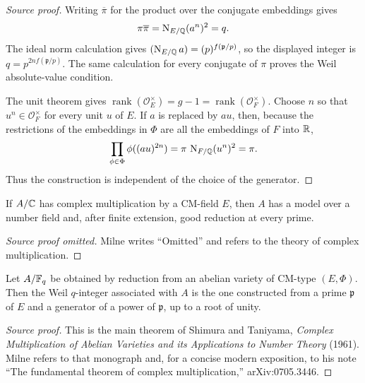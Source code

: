 \begin{proof}[Source proof]
Writing $\overline{\pi}$ for the product over the conjugate embeddings gives
\[
 \pi\overline{\pi}=\operatorname{N}_{E/\mathbb{Q}}(a^n)^2=q.
\]
The ideal norm calculation gives
$(\operatorname{N}_{E/\mathbb{Q}}a)=(p)^{f(\mathfrak p/p)}$, so the displayed integer is
$q=p^{2nf(\mathfrak p/p)}$. The same calculation for every conjugate of
$\pi$ proves the Weil absolute-value condition.

The unit theorem gives
$\operatorname{rank}(\mathcal O_E^\times)=g-1=\operatorname{rank}(\mathcal O_F^\times)$.
Choose $n$ so that $u^n\in\mathcal O_F^\times$ for every unit $u$ of $E$.
If $a$ is replaced by $au$, then, because the restrictions of the embeddings
in $\Phi$ are all the embeddings of $F$ into $\mathbb{R}$,
\[
 \prod_{\phi\in\Phi}\phi((au)^{2n})
 =\pi\,\operatorname{N}_{F/\mathbb{Q}}(u^n)^2=\pi.
\]
Thus the construction is independent of the choice of the generator.
\end{proof}

\begin{proposition}[CM reduction]\label{prop:milne-cm-reduction}
If $A/\mathbb{C}$ has complex multiplication by a CM-field $E$, then $A$ has a model over a number field and, after finite extension, good reduction at every prime.
\end{proposition}
\begin{proof}[Source proof omitted]
Milne writes ``Omitted'' and refers to the theory of complex multiplication.
\end{proof}
\begin{theorem}\label{thm:milne-shimura-taniyama}
Let $A/\mathbb{F}_q$ be obtained by reduction from an abelian variety of CM-type
$(E,\Phi)$. Then the Weil $q$-integer associated with $A$ is the one
constructed from a prime $\mathfrak p$ of $E$ and a generator of a power of
$\mathfrak p$, up to a root of unity.
\end{theorem}

\begin{proof}[Source proof]

This is the main theorem of Shimura and Taniyama,
\emph{Complex Multiplication of Abelian Varieties and its Applications to
Number Theory} (1961).  Milne refers to that monograph and, for a concise
modern exposition, to his note ``The fundamental theorem of complex
multiplication,'' arXiv:0705.3446.

\end{proof}
